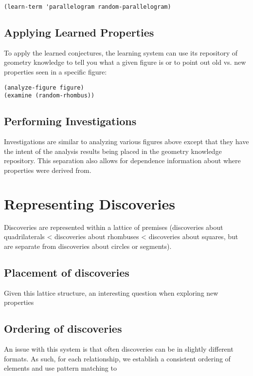 \begin{verbatim}
(learn-term 'parallelogram random-parallelogram)
\end{verbatim}

\subsection{Applying Learned Properties}

To apply the learned conjectures, the learning system can use its
repository of geometry knowledge to tell you what a given figure is or
to point out old vs. new properties seen in a specific figure:

\begin{verbatim}
(analyze-figure figure)
(examine (random-rhombus))
\end{verbatim}

\subsection{Performing Investigations}

Investigations are similar to analyzing various figures above except
that they have the intent of the analysis results being placed in the
geometry knowledge repository. This separation also allows for
dependence information about where properties were derived from.

\section{Representing Discoveries}

Discoveries are represented within a lattice of premises (discoveries
about quadrilaterals < discoveries about rhombuses < discoveries about
squares, but are separate from discoveries about circles or segments).

\subsection{Placement of discoveries}

Given this lattice structure, an interesting question when exploring
new properties

\subsection{Ordering of discoveries}

An issue with this system is that often discoveries can be in slightly
different formats. As such, for each relationship, we establish a
consistent ordering of elements and use pattern matching to

